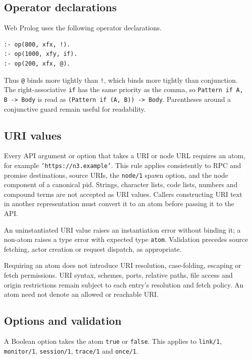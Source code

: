 \subsection{Operator declarations}\label{sec:manual-operator-declarations}
Web Prolog uses the following operator declarations.

\begin{verbatim}
:- op(800, xfx, !).
:- op(1000, xfy, if).
:- op(200, xfx, @).
\end{verbatim}

\noindent Thus \texttt{@} binds more tightly than \texttt{!}, which binds
more tightly than conjunction. The right-associative \texttt{if} has the
same priority as the comma, so
\texttt{Pattern\,if A,\,B\,->\,Body} is read as
\texttt{(Pattern\,if\,(A,\,B))\,->\,Body}. Parentheses around a conjunctive guard
remain useful for readability.

\subsection{URI values}\label{sec:manual-uri-values}
Every API argument or option that takes a URI or node URL requires an atom,
for example \texttt{'https://n3.example'}. This rule applies consistently to
RPC and promise destinations, source URIs, the \texttt{node/1} spawn option,
and the node component of a canonical pid. Strings, character lists, code
lists, numbers and compound terms are not accepted as URI values. Callers
constructing URI text in another representation must convert it to an atom
before passing it to the API.

An uninstantiated URI value raises an instantiation error without binding it;
a non-atom raises a type error with expected type \texttt{atom}. Validation
precedes source fetching, actor creation or request dispatch, as appropriate.

Requiring an atom does not introduce URI resolution, case-folding, escaping
or fetch permissions. URI syntax, schemes, ports, relative paths, file access
and origin restrictions remain subject to each entry's resolution and fetch
policy. An atom need not denote an allowed or reachable URI.

\subsection{Options and validation}\label{sec:manual-options}
A Boolean option takes the atom \texttt{true} or \texttt{false}. This applies
to \texttt{link/1}, \texttt{monitor/1}, \texttt{session/1}, \texttt{trace/1}
and \texttt{once/1}.

